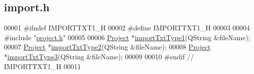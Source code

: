 \hypertarget{import_8h_source}{}\subsection{import.\+h}
\label{import_8h_source}

\begin{DoxyCode}
00001 \textcolor{preprocessor}{#ifndef IMPORTTXT1\_H}
00002 \textcolor{preprocessor}{#define IMPORTTXT1\_H}
00003 
00004 \textcolor{preprocessor}{#include "\hyperlink{project_8h}{project.h}"}
00005 
00006 \hyperlink{class_project}{Project} *\hyperlink{import_8h_a67dd59b2afe82bc7272ad6dfd3bed633}{importTxtType1}(QString &fileName);
00007 \hyperlink{class_project}{Project} *\hyperlink{import_8h_a05a39d4117f6721dc4bbdd7d45bcdd45}{importTxtType2}(QString &fileName);
00008 \hyperlink{class_project}{Project} *\hyperlink{import_8h_ac1810dcefba801e18ee9900ed6c0ff82}{importTxtType3}(QString &fileName);
00009 
00010 \textcolor{preprocessor}{#endif // IMPORTTXT1\_H}
00011 
\end{DoxyCode}
